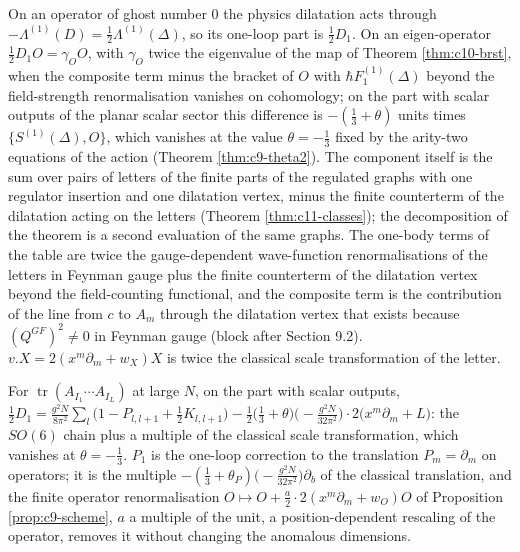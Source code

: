 \begin{remark}
On an operator of ghost number $0$ the physics dilatation acts through $-\Lambda^{(1)}(D)=\tfrac12\Lambda^{(1)}(\Delta)$, so its one-loop part is $\tfrac12D_1$. On an eigen-operator $\tfrac12D_1O=\gamma_OO$, with $\gamma_O$ twice the eigenvalue of the map of Theorem \ref{thm:c10-brst}, when the composite term minus the bracket of $O$ with $\hbar F_1^{(1)}(\Delta)$ beyond the field-strength renormalisation vanishes on cohomology; on the part with scalar outputs of the planar scalar sector this difference is $-(\tfrac13+\theta)$ units times $\{S^{(1)}(\Delta),O\}$, which vanishes at the value $\theta=-\tfrac13$ fixed by the arity-two equations of the action (Theorem \ref{thm:c9-theta2}). The component itself is the sum over pairs of letters of the finite parts of the regulated graphs with one regulator insertion and one dilatation vertex, minus the finite counterterm of the dilatation acting on the letters (Theorem \ref{thm:c11-classes}); the decomposition of the theorem is a second evaluation of the same graphs. The one-body terms of the table are twice the gauge-dependent wave-function renormalisations of the letters in Feynman gauge plus the finite counterterm of the dilatation vertex beyond the field-counting functional, and the composite term is the contribution of the line from $c$ to $A_m$ through the dilatation vertex that exists because $(Q^{GF})^2\neq0$ in Feynman gauge (block after Section 9.2). $v.X=2(x^m\partial_m+w_X)X$ is twice the classical scale transformation of the letter.
\end{remark}

\begin{remark}
For $\operatorname{tr}(A_{I_1}\cdots A_{I_L})$ at large $N$, on the part with scalar outputs, $\tfrac12D_1=\frac{g^2N}{8\pi^2}\sum_l\big(1-P_{l,l+1}+\tfrac12K_{l,l+1}\big)-\tfrac12\big(\tfrac13+\theta\big)\big(-\frac{g^2N}{32\pi^2}\big)\cdot2\big(x^m\partial_m+L\big)$: the $SO(6)$ chain plus a multiple of the classical scale transformation, which vanishes at $\theta=-\tfrac13$. $P_1$ is the one-loop correction to the translation $P_m=\partial_m$ on operators; it is the multiple $-(\tfrac13+\theta_P)\big(-\frac{g^2N}{32\pi^2}\big)\partial_b$ of the classical translation, and the finite operator renormalisation $O\mapsto O+\tfrac a2\cdot2(x^m\partial_m+w_O)O$ of Proposition \ref{prop:c9-scheme}, $a$ a multiple of the unit, a position-dependent rescaling of the operator, removes it without changing the anomalous dimensions.
\end{remark}

